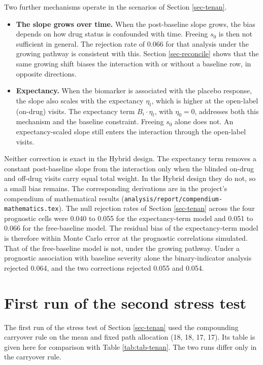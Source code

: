 \documentclass[
  11pt,
]{article}
\providecommand{\tightlist}{%
  \setlength{\itemsep}{0pt}\setlength{\parskip}{0pt}}
\begin{document}
Two further mechanisms operate in the scenarios of Section
\ref{sec-tenan}.

\begin{itemize}
\tightlist
\item
  \textbf{The slope grows over time.} When the post-baseline slope grows,
  the bias depends on how drug status is confounded with time.
  Freeing \(s_0\) is then not sufficient in general. The rejection rate
  of 0.066 for that analysis under the
  growing pathway is consistent with this. Section
  \ref{sec-reconcile} shows that the same growing shift biases the
  interaction with or without a baseline row, in opposite directions.
\item
  \textbf{Expectancy.} When the biomarker is associated with the placebo
  response, the slope also scales with the expectancy \(\eta_t\), which
  is higher at the open-label (on-drug) visits. The expectancy term
  \(B_i \cdot \eta_t\), with \(\eta_0 = 0\), addresses both this mechanism
  and the baseline constraint. Freeing \(s_0\) alone does not. An
  expectancy-scaled slope still enters the interaction through the
  open-label visits.
\end{itemize}

Neither correction is exact in the Hybrid design. The expectancy term
removes a constant post-baseline slope from the interaction only when
the blinded on-drug and off-drug visits carry equal total weight. In
the Hybrid design they do not, so a small bias remains. The
corresponding derivations are in the project's compendium of
mathematical results (\texttt{analysis/report/compendium-mathematics.tex}).
The null rejection rates of Section \ref{sec-tenan} across the four
prognostic cells were 0.040 to
0.055 for the expectancy-term model and
0.051 to 0.066 for the
free-baseline model. The residual bias of the expectancy-term model is
therefore within Monte Carlo error at the prognostic correlations
simulated. That of the free-baseline model is not, under the growing
pathway. Under a prognostic association with baseline severity alone
the binary-indicator analysis rejected
0.064, and the two corrections rejected
0.055 and 0.054.

\section{First run of the second stress test}\label{sec-firstrun}

The first run of the stress test of Section \ref{sec-tenan} used the
compounding carryover rule on the mean and fixed path allocation (18,
18, 17, 17). Its table is given here for comparison with Table
\ref{tab:tab-tenan}. The two runs differ only in the carryover rule.
\end{document}
